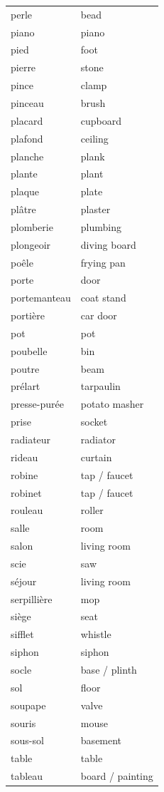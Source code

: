 \documentclass[12pt,a4paper]{article}
\begin{document}
\begin{longtable}{p{4cm} p{6cm}}
perle & bead \\
piano & piano \\
pied & foot \\
pierre & stone \\
pince & clamp \\
pinceau & brush \\
placard & cupboard \\
plafond & ceiling \\
planche & plank \\
plante & plant \\
plaque & plate \\
plâtre & plaster \\
plomberie & plumbing \\
plongeoir & diving board \\
poêle & frying pan \\
porte & door \\
portemanteau & coat stand \\
portière & car door \\
pot & pot \\
poubelle & bin \\
poutre & beam \\
prélart & tarpaulin \\
presse-purée & potato masher \\
prise & socket \\
radiateur & radiator \\
rideau & curtain \\
robine & tap / faucet \\
robinet & tap / faucet \\
rouleau & roller \\
salle & room \\
salon & living room \\
scie & saw \\
séjour & living room \\
serpillière & mop \\
siège & seat \\
sifflet & whistle \\
siphon & siphon \\
socle & base / plinth \\
sol & floor \\
soupape & valve \\
souris & mouse \\
sous-sol & basement \\
table & table \\
tableau & board / painting \\

\end{longtable}
\end{document}
